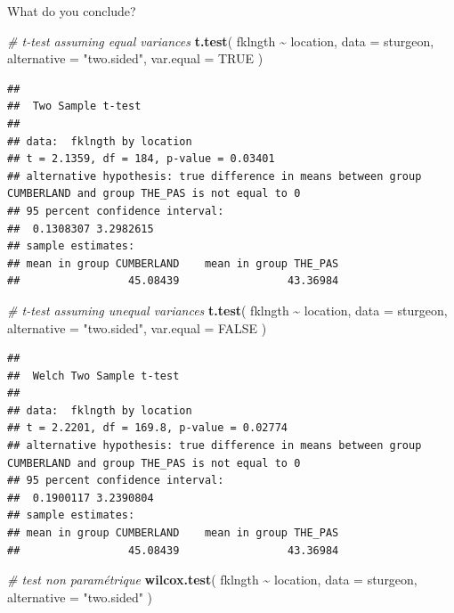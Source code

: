 \documentclass[
  12pt,
]{book}
\newenvironment{Shaded}{\begin{snugshade}}{\end{snugshade}}
\newcommand{\CommentTok}[1]{\textcolor[rgb]{0.56,0.35,0.01}{\textit{#1}}}
\newcommand{\DataTypeTok}[1]{\textcolor[rgb]{0.13,0.29,0.53}{#1}}
\newcommand{\KeywordTok}[1]{\textcolor[rgb]{0.13,0.29,0.53}{\textbf{#1}}}
\newcommand{\NormalTok}[1]{#1}
\newcommand{\OperatorTok}[1]{\textcolor[rgb]{0.81,0.36,0.00}{\textbf{#1}}}
\newcommand{\OtherTok}[1]{\textcolor[rgb]{0.56,0.35,0.01}{#1}}
\newcommand{\StringTok}[1]{\textcolor[rgb]{0.31,0.60,0.02}{#1}}
\begin{document}
What do you conclude?

\begin{Shaded}
\begin{Highlighting}[]
\CommentTok{\# t{-}test assuming equal variances}
\KeywordTok{t.test}\NormalTok{(}
\NormalTok{  fklngth }\OperatorTok{\textasciitilde{}}\StringTok{ }\NormalTok{location,}
  \DataTypeTok{data =}\NormalTok{ sturgeon,}
  \DataTypeTok{alternative =} \StringTok{"two.sided"}\NormalTok{,}
  \DataTypeTok{var.equal =} \OtherTok{TRUE}
\NormalTok{)}
\end{Highlighting}
\end{Shaded}

\begin{verbatim}
## 
##  Two Sample t-test
## 
## data:  fklngth by location
## t = 2.1359, df = 184, p-value = 0.03401
## alternative hypothesis: true difference in means between group CUMBERLAND and group THE_PAS is not equal to 0
## 95 percent confidence interval:
##  0.1308307 3.2982615
## sample estimates:
## mean in group CUMBERLAND    mean in group THE_PAS 
##                 45.08439                 43.36984
\end{verbatim}

\begin{Shaded}
\begin{Highlighting}[]
\CommentTok{\# t{-}test assuming unequal variances}
\KeywordTok{t.test}\NormalTok{(}
\NormalTok{  fklngth }\OperatorTok{\textasciitilde{}}\StringTok{ }\NormalTok{location,}
  \DataTypeTok{data =}\NormalTok{ sturgeon,}
  \DataTypeTok{alternative =} \StringTok{"two.sided"}\NormalTok{,}
  \DataTypeTok{var.equal =} \OtherTok{FALSE}
\NormalTok{)}
\end{Highlighting}
\end{Shaded}

\begin{verbatim}
## 
##  Welch Two Sample t-test
## 
## data:  fklngth by location
## t = 2.2201, df = 169.8, p-value = 0.02774
## alternative hypothesis: true difference in means between group CUMBERLAND and group THE_PAS is not equal to 0
## 95 percent confidence interval:
##  0.1900117 3.2390804
## sample estimates:
## mean in group CUMBERLAND    mean in group THE_PAS 
##                 45.08439                 43.36984
\end{verbatim}

\begin{Shaded}
\begin{Highlighting}[]
\CommentTok{\# test non paramétrique}
\KeywordTok{wilcox.test}\NormalTok{(}
\NormalTok{  fklngth }\OperatorTok{\textasciitilde{}}\StringTok{ }\NormalTok{location,}
  \DataTypeTok{data =}\NormalTok{ sturgeon,}
  \DataTypeTok{alternative =} \StringTok{"two.sided"}
\NormalTok{)}
\end{Highlighting}
\end{Shaded}
\end{document}

